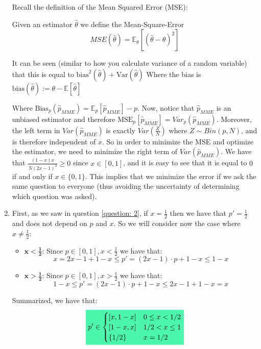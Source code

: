 \documentclass[../main.tex]{subfiles}
\begin{document}
\begin{enumerate}
    Recall the definition of the Mean Squared Error (MSE):
    \begin{mdframed}[backgroundcolor=blue!20]
        \begin{definition}
            Given an estimator $\hat{\theta}$ we define the Mean-Square-Error \[MSE(\hat{\theta})=\mathbb{E}_{\theta}\left[(\hat{\theta}-\theta)^2\right]\]
        \end{definition}
        It can be seen (similar to how you calculate variance of a random variable) that this is equal to $\text{bias}^2(\hat{\theta})+\text{Var}(\hat{\theta})$ Where the bias is $\text{bias}(\hat{\theta}):=\theta-\mathbb{E}[\hat{\theta}]$
    \end{mdframed}
    Where $\text{Bias}_p(\hat{p}_{MME}) = \mathbb{E}_p\left[\hat{p}_{MME}\right]-p$.
    Now, notice that $\hat{p}_{MME}$ is an unbiased estimator and therefore $\text{MSE}_p[\hat{p}_{MME}] = Var_p(\hat{p}_{MME})$. Moreover, the left term in $Var(\hat{p}_{MME})$ is exactly $Var\left(\frac{Z}{N}\right)$ where $Z\sim Bin(p, N)$, and is therefore independent of $x$. So in order to minimize the MSE and optimize the estimator, we need to minimize the right term of $Var(\hat{p}_{MME})$. We have that $\frac{(1-x)x}{N(2x-1)^2}\ge0$ since $x\in[0,1]$, and it is easy to see that it is equal to $0$ if and only if $x\in \{0, 1\}$. This implies that we minimize the error if we ask the same question to everyone (thus avoiding the uncertainty of determining which question was asked).
    \item \label{question: 4}First, as we saw in question \ref{question: 2}, if $x=\frac{1}{2}$ then we have that $p' =\frac{1}{2}$ and does not depend on 
    $p$ and $x$. So we will consider now the case where $x\neq \frac{1}{2}$:
    \begin{itemize}
        \item $\boldsymbol{x<\frac{1}{2}}$: Since $p\in [0, 1], x<\frac{1}{2}$ we have that:
        $$x=2x-1+1-x\le p' = (2x-1)\cdot p +1 -x\le1-x$$
        \item $\boldsymbol{x>\frac{1}{2}}$: Since $p\in [0, 1], x>\frac{1}{2}$ we have that:
        $$1-x\le p' = (2x-1)\cdot p +1 -x\le2x-1+1-x=x$$
    \end{itemize}
    Summarized, we have that: 
    \[\mathcolorbox{goodcolor}{p' \in \begin{cases} 
    [x, 1-x] & 0\le x<1/2\\
    [1-x, x] & 1/2< x\le 1\\
    \left\{1/2\right\} & x= 1/2
    \end{cases}}\]

\end{enumerate}
\end{document}
